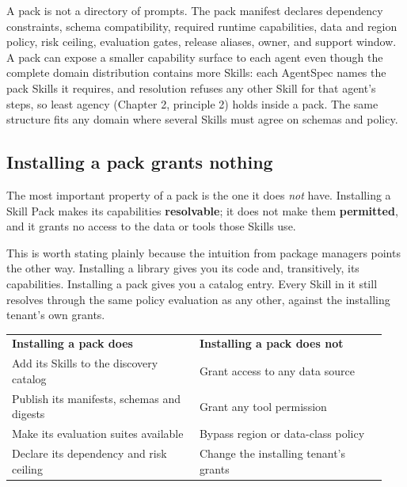 A pack is not a directory of prompts. The pack manifest declares dependency constraints, schema compatibility, required runtime capabilities, data and region policy, risk ceiling, evaluation gates, release aliases, owner, and support window. A pack can expose a smaller capability surface to each agent even though the complete domain distribution contains more Skills: each AgentSpec names the pack Skills it requires, and resolution refuses any other Skill for that agent's steps, so least agency (Chapter 2, principle 2) holds inside a pack. The same structure fits any domain where several Skills must agree on schemas and policy.\par

\subsection{Installing a pack grants nothing}

The most important property of a pack is the one it does \emph{not} have. Installing a Skill Pack makes its capabilities \textbf{resolvable}; it does not make them \textbf{permitted}, and it grants no access to the data or tools those Skills use.\par

This is worth stating plainly because the intuition from package managers points the other way. Installing a library gives you its code and, transitively, its capabilities. Installing a pack gives you a catalog entry. Every Skill in it still resolves through the same policy evaluation as any other, against the installing tenant's own grants.\par

\BookTableStart
\small
\begin{tabular}{@{}Y{0.4700\linewidth}Y{0.4700\linewidth}@{}}
\color{white}\bfseries Installing a pack does & \color{white}\bfseries Installing a pack does not \\
Add its Skills to the discovery catalog & Grant access to any data source \\
Publish its manifests, schemas and digests & Grant any tool permission \\
Make its evaluation suites available & Bypass region or data-class policy \\
Declare its dependency and risk ceiling & Change the installing tenant's grants \\
\end{tabular}
\BookTableEnd

